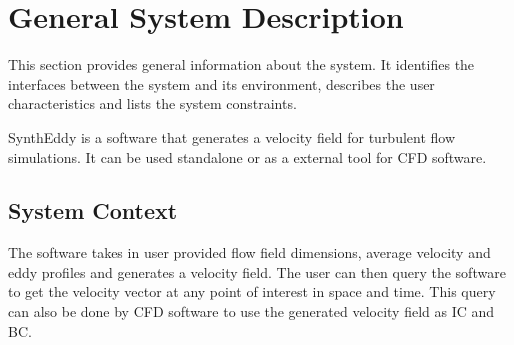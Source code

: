 \documentclass[12pt]{article}
\begin{document}
\section{General System Description}

This section provides general information about the system.  It identifies the
interfaces between the system and its environment, describes the user
characteristics and lists the system constraints.  

SynthEddy is a software that generates a velocity field for turbulent flow simulations. It can be used standalone or as a external tool for CFD software.


\subsection{System Context}

The software takes in user provided flow field dimensions, average velocity and eddy profiles and generates a velocity field. The user can then query the software to get the velocity vector at any point of interest in space and time. This query can also be done by CFD software to use the generated velocity field as IC and BC.

\end{document}
